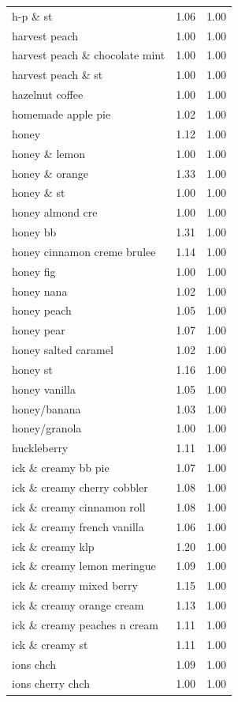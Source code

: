 \begin{table}
\begin{tabular}{lrr}
h-p \& st & 1.06 & 1.00 \\
harvest peach & 1.00 & 1.00 \\
harvest peach \& chocolate mint & 1.00 & 1.00 \\
harvest peach \& st & 1.00 & 1.00 \\
hazelnut coffee & 1.00 & 1.00 \\
homemade apple pie & 1.02 & 1.00 \\
honey & 1.12 & 1.00 \\
honey \& lemon & 1.00 & 1.00 \\
honey \& orange & 1.33 & 1.00 \\
honey \& st & 1.00 & 1.00 \\
honey almond cre & 1.00 & 1.00 \\
honey bb & 1.31 & 1.00 \\
honey cinnamon creme brulee & 1.14 & 1.00 \\
honey fig & 1.00 & 1.00 \\
honey nana & 1.02 & 1.00 \\
honey peach & 1.05 & 1.00 \\
honey pear & 1.07 & 1.00 \\
honey salted caramel & 1.02 & 1.00 \\
honey st & 1.16 & 1.00 \\
honey vanilla & 1.05 & 1.00 \\
honey/banana & 1.03 & 1.00 \\
honey/granola & 1.00 & 1.00 \\
huckleberry & 1.11 & 1.00 \\
ick \& creamy bb pie & 1.07 & 1.00 \\
ick \& creamy cherry cobbler & 1.08 & 1.00 \\
ick \& creamy cinnamon roll & 1.08 & 1.00 \\
ick \& creamy french vanilla & 1.06 & 1.00 \\
ick \& creamy klp & 1.20 & 1.00 \\
ick \& creamy lemon meringue & 1.09 & 1.00 \\
ick \& creamy mixed berry & 1.15 & 1.00 \\
ick \& creamy orange cream & 1.13 & 1.00 \\
ick \& creamy peaches n cream & 1.11 & 1.00 \\
ick \& creamy st & 1.11 & 1.00 \\
ions chch & 1.09 & 1.00 \\
ions cherry chch & 1.00 & 1.00 \\

\end{tabular}
\end{table}

